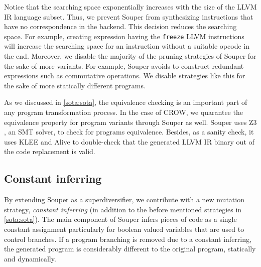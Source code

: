 Notice that the searching space exponentially increases with the size of the LLVM IR language subset. Thus,
we prevent Souper from synthesizing instructions that have no correspondence in the \wasm backend. This decision reduces the searching space. For example, creating expression having the  \texttt{freeze} LLVM instructions will increase the searching space for an instruction without a suitable opcode in the end.
Moreover, we disable the majority of the pruning strategies of Souper for the sake of more variants. For example, Souper avoids to construct redundant expressions such as commutative operations. We disable strategies like this for the sake of more statically different programs.  %


As we discussed in \autoref{sota:sota}, the equivalence checking is an important part of any program transformation process. In the case of CROW, we quarantee the equivalence property for program variants through Souper as well. Souper uses Z3 \citationneeded, an SMT solver, to check for programs equivalence.  Besides, as a sanity check, it uses KLEE and Alive to double-check that the generated LLVM IR binary out of the code replacement is valid.



\subsection*{Constant inferring}

By extending Souper as a superdiversifier, we contribute with a new mutation strategy, \emph{constant inferring} (in addition to the before mentioned strategies in \autoref{sota:sota}).  
The main component of Souper infers pieces of code as a single constant assignment particularly for boolean valued variables that are used to control branches.
If a program branching is removed due to a constant inferring, the generated program is considerably different to the original program, statically and dynamically.

